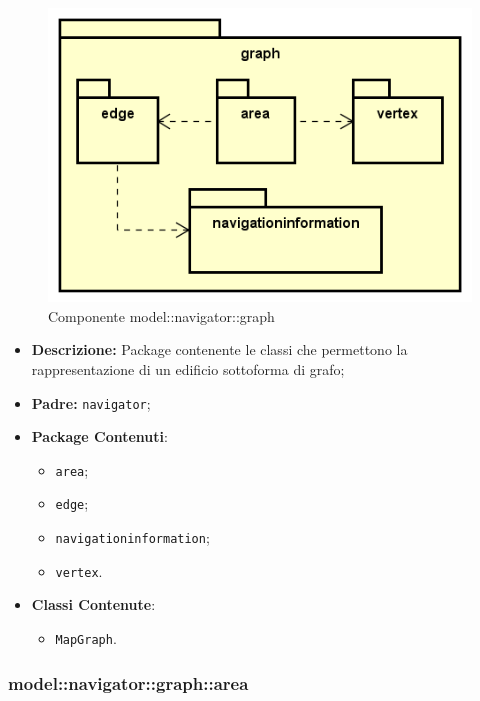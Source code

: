 \documentclass[../DefinizioneDiProdotto.tex]{subfiles}
\begin{document}
\begin{figure}[H]
	\centering
	\includegraphics[width=\maxwidth]{img/package/graph.png}
	\caption{Componente model::\-navigator::\-graph}\label{fig:model::navigator::graph} 
\end{figure}
\begin{itemize}
	\item \textbf{Descrizione:} Package contenente le classi che permettono la rappresentazione di un edificio sottoforma di grafo;
	\item \textbf{Padre:} \texttt{navigator};
	\item \textbf{Package Contenuti}:
	\begin{itemize}
		\item \texttt{area};
		
		\item \texttt{edge};
		
		\item \texttt{navigationinformation};
		
		\item \texttt{vertex}.
		
	\end{itemize}
	\item \textbf{Classi Contenute}:
	\begin{itemize}
		\item \texttt{MapGraph}.
		
	\end{itemize}
\end{itemize}

\subsubsection{model::\-navigator::\-graph::\-area}
\end{document}
